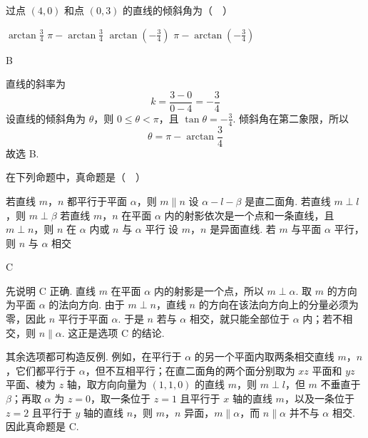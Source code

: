 \documentclass[UTF8,a4paper,oneside,11pt]{ctexbook}
\begin{document}
\begin{problem}
过点 \((4,0)\) 和点 \((0,3)\) 的直线的倾斜角为（\(\quad\)）

\choices
    {\(\arctan \frac{3}{4}\)}
    {\(\pi-\arctan \frac{3}{4}\)}
    {\(\arctan\left(-\frac{3}{4}\right)\)}
    {\(\pi-\arctan\left(-\frac{3}{4}\right)\)}
\end{problem}

\begin{answer}
B
\end{answer}

\begin{solution}
直线的斜率为
\[
k=\frac{3-0}{0-4}=-\frac{3}{4}
\]
设直线的倾斜角为 \(\theta\)，则 \(0\leq\theta<\pi\)，且 \(\tan\theta=-\frac{3}{4}\). 倾斜角在第二象限，所以
\[
\theta=\pi-\arctan\frac{3}{4}
\]
故选 B.
\end{solution}

\begin{problem}
在下列命题中，真命题是（\(\quad\)）

\choices
    {若直线 \(m\)，\(n\) 都平行于平面 \(\alpha\)，则 \(m\parallel n\)}
    {设 \(\alpha-l-\beta\) 是直二面角. 若直线 \(m\perp l\)，则 \(m\perp\beta\)}
    {若直线 \(m\)，\(n\) 在平面 \(\alpha\) 内的射影依次是一个点和一条直线，且 \(m\perp n\)，则 \(n\) 在 \(\alpha\) 内或 \(n\) 与 \(\alpha\) 平行}
    {设 \(m\)，\(n\) 是异面直线. 若 \(m\) 与平面 \(\alpha\) 平行，则 \(n\) 与 \(\alpha\) 相交}
\end{problem}

\begin{answer}
C
\end{answer}

\begin{solution}
先说明 C 正确. 直线 \(m\) 在平面 \(\alpha\) 内的射影是一个点，所以 \(m\perp\alpha\). 取 \(m\) 的方向为平面 \(\alpha\) 的法向方向. 由于 \(m\perp n\)，直线 \(n\) 的方向在该法向方向上的分量必须为零，因此 \(n\) 平行于平面 \(\alpha\). 于是 \(n\) 若与 \(\alpha\) 相交，就只能全部位于 \(\alpha\) 内；若不相交，则 \(n\parallel\alpha\). 这正是选项 C 的结论.

其余选项都可构造反例. 例如，在平行于 \(\alpha\) 的另一个平面内取两条相交直线 \(m\)，\(n\)，它们都平行于 \(\alpha\)，但不互相平行；在直二面角的两个面分别取为 \(xz\) 平面和 \(yz\) 平面、棱为 \(z\) 轴，取方向向量为 \((1,1,0)\) 的直线 \(m\)，则 \(m\perp l\)，但 \(m\) 不垂直于 \(\beta\)；再取 \(\alpha\) 为 \(z=0\)，取一条位于 \(z=1\) 且平行于 \(x\) 轴的直线 \(m\)，以及一条位于 \(z=2\) 且平行于 \(y\) 轴的直线 \(n\)，则 \(m\)，\(n\) 异面，\(m\parallel\alpha\)，而 \(n\parallel\alpha\) 并不与 \(\alpha\) 相交. 因此真命题是 C.
\end{solution}
\end{document}
